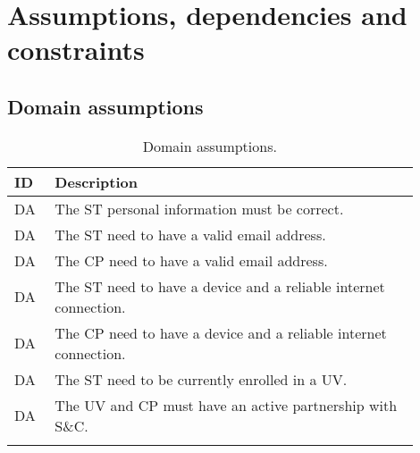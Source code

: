 \section{Assumptions, dependencies and constraints}
\label{sec:assumptions_dependencies_constraints}%

\subsection{Domain assumptions}
\label{subsec:domain_assumptions}%
\setcounter{da}{1}
\newcommand{\cda}{\theda\stepcounter{da}}
\begin{center}
    \begin{longtable}{ |l|p{0.9\linewidth}| }
        \hline
        \textbf{ID} & \textbf{Description} \\
        \hline
        DA\cda      & The ST personal information must be correct. \\
        \hline
        DA\cda      & The ST need to have a valid email address. \\
        \hline
        DA\cda      & The CP need to have a valid email address. \\
        \hline
        DA\cda      & The ST need to have a device and a reliable internet connection. \\
        \hline
        DA\cda      & The CP need to have a device and a reliable internet connection. \\
        \hline
        DA\cda      & The ST need to be currently enrolled in a UV. \\
        \hline
        DA\cda      & The UV and CP must have an active partnership with S\&C. \\
        \hline
        \caption{Domain assumptions.}
        \label{tab:domainassmptn_tab}%
    \end{longtable}
\end{center}